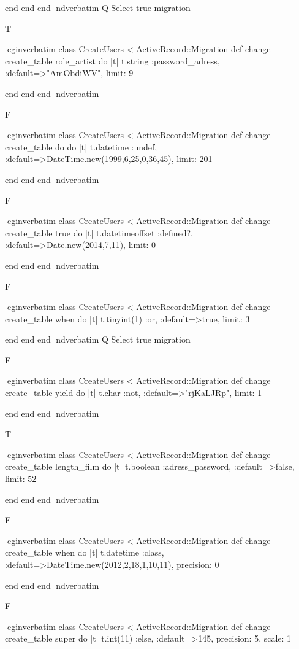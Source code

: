     end 
  end 
end
nd{verbatim}
Q
 Select true migration

T

egin{verbatim}
 class CreateUsers < ActiveRecord::Migration 
  def change 
    create_table role_artist do |t| 
      t.string :password_adress, :default=>"AmObdiWV", limit: 9
    
    end 
  end 
end
nd{verbatim}

F

egin{verbatim}
 class CreateUsers < ActiveRecord::Migration 
  def change 
    create_table do do |t| 
      t.datetime :undef, :default=>DateTime.new(1999,6,25,0,36,45), limit: 201
    
    end 
  end 
end
nd{verbatim}

F

egin{verbatim}
 class CreateUsers < ActiveRecord::Migration 
  def change 
    create_table true do |t| 
      t.datetimeoffset :defined?, :default=>Date.new(2014,7,11), limit: 0
    
    end 
  end 
end
nd{verbatim}

F

egin{verbatim}
 class CreateUsers < ActiveRecord::Migration 
  def change 
    create_table when do |t| 
      t.tinyint(1) :or, :default=>true, limit: 3
    
    end 
  end 
end
nd{verbatim}
Q
 Select true migration

F

egin{verbatim}
 class CreateUsers < ActiveRecord::Migration 
  def change 
    create_table yield do |t| 
      t.char :not, :default=>"rjKaLJRp", limit: 1
    
    end 
  end 
end
nd{verbatim}

T

egin{verbatim}
 class CreateUsers < ActiveRecord::Migration 
  def change 
    create_table length_film do |t| 
      t.boolean :adress_password, :default=>false, limit: 52
    
    end 
  end 
end
nd{verbatim}

F

egin{verbatim}
 class CreateUsers < ActiveRecord::Migration 
  def change 
    create_table when do |t| 
      t.datetime :class, :default=>DateTime.new(2012,2,18,1,10,11), precision: 0
    
    end 
  end 
end
nd{verbatim}

F

egin{verbatim}
 class CreateUsers < ActiveRecord::Migration 
  def change 
    create_table super do |t| 
      t.int(11) :else, :default=>145, precision: 5, scale: 1
    
